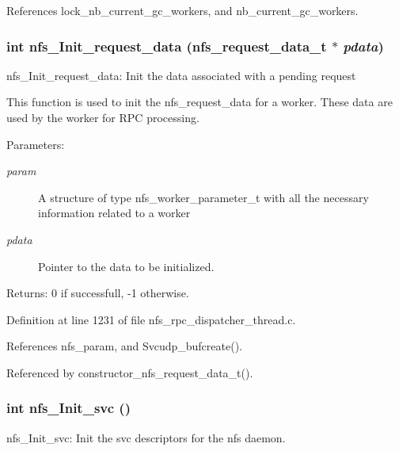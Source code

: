 References lock\_\-nb\_\-current\_\-gc\_\-workers, and nb\_\-current\_\-gc\_\-workers.
\subsubsection{\setlength{\rightskip}{0pt plus 5cm}int nfs\_\-Init\_\-request\_\-data (nfs\_\-request\_\-data\_\-t $\ast$ {\em pdata})}\label{nfs__rpc__dispatcher__thread_8c_a28}


nfs\_\-Init\_\-request\_\-data: Init the data associated with a pending request

This function is used to init the nfs\_\-request\_\-data for a worker. These data are used by the worker for RPC processing.

\begin{Desc}
\item[Parameters:]
\begin{description}
\item[{\em param}]A structure of type nfs\_\-worker\_\-parameter\_\-t with all the necessary information related to a worker \item[{\em pdata}]Pointer to the data to be initialized.\end{description}
\end{Desc}
\begin{Desc}
\item[Returns:]0 if successfull, -1 otherwise. \end{Desc}


Definition at line 1231 of file nfs\_\-rpc\_\-dispatcher\_\-thread.c.

References nfs\_\-param, and Svcudp\_\-bufcreate().

Referenced by constructor\_\-nfs\_\-request\_\-data\_\-t().
\subsubsection{\setlength{\rightskip}{0pt plus 5cm}int nfs\_\-Init\_\-svc ()}\label{nfs__rpc__dispatcher__thread_8c_a20}


nfs\_\-Init\_\-svc: Init the svc descriptors for the nfs daemon.

